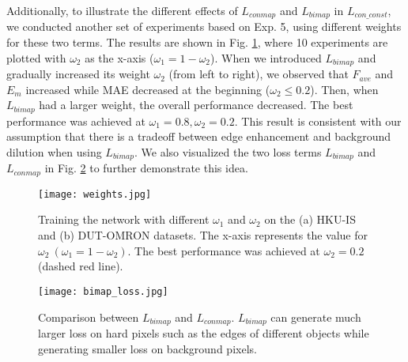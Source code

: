 \documentclass[final]{cvpr}
\begin{document}
Additionally, to illustrate the different effects of $L_{conmap}$ and $L_{bimap}$ in $L_{con\_const}$, we conducted another set of experiments based on Exp. 5, using different weights for these two terms. The results are shown in Fig. \ref{weight}, where 10 experiments are plotted with $\omega_2$ as the x-axis ($\omega_1=1- \omega_2$). When we introduced $L_{bimap}$ and gradually increased its weight $\omega_2$ (from left to right), we observed that $F_{ave}$  and $E_m$ increased while MAE decreased at the beginning ($\omega_2 \leq 0.2$). Then, when $L_{bimap}$ had a larger weight, the overall performance decreased. The best performance was achieved at $\omega_1=0.8,\omega_2=0.2$. This result is consistent with our assumption that there is a tradeoff between edge enhancement and background dilution when using $L_{bimap}$. We also visualized the two loss terms $L_{bimap}$ and $L_{conmap}$ in Fig. \ref{bimap_loss} to further demonstrate this idea. 



\begin{figure}[h]
\begin{center}
   \texttt{[image: weights.jpg]}
\end{center}
\vspace{-10pt}
\caption{Training the network with different $\omega_1$  and $\omega_2$ on the (a) HKU-IS and (b) DUT-OMRON datasets. The x-axis represents the value for $\omega_2 \ (\omega_1=1- \omega_2)$. The best performance was achieved at $\omega_2=0.2$ (dashed red line).}
\label{weight}
\vspace{-5pt}
\end{figure}

\begin{figure}[h!]
\begin{center}
   \texttt{[image: bimap\_loss.jpg]}
\end{center}
\vspace{-10pt}
\caption{Comparison between $L_{bimap}$ and $L_{conmap}$. $L_{bimap}$ can generate much larger loss on hard pixels such as the edges of different objects while generating smaller loss on background pixels.}
\label{bimap_loss}
\vspace{-5pt}
\end{figure}
\end{document}

